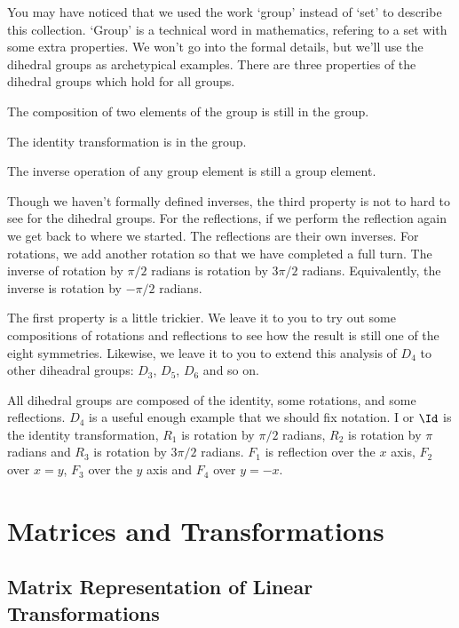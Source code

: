 \documentclass[fleqn]{report}
\begin{document}
You may have noticed that we used the work `group' instead of
`set' to describe this collection. `Group' is a technical
word in mathematics, refering to a set with some extra
properties. We won't go into the formal details, but we'll
use the dihedral groups as archetypical examples.
There are three properties of the dihedral groups which
hold for all groups.

\begin{smallitemize}
\item The composition of two elements of the group is still in
the group.
\item The identity transformation is in the group.
\item The inverse operation of any group element is still a
group element.
\end{smallitemize} 

Though we haven't formally defined inverses, the third
property is not to hard to see for the dihedral
groups. For the reflections, if we perform the reflection
again we get back to where we started. The reflections are
their own inverses. For rotations, we add another rotation
so that we have completed a full turn. The inverse of
rotation by $\pi/2$ radians is rotation by $3\pi/2$ radians.
Equivalently, the inverse is rotation by $-\pi/2$ radians.

The first property is a little trickier. We leave it to you to
try out some compositions of rotations and reflections to see
how the result is still one of the eight symmetries. Likewise,
we leave it to you to extend this analysis of $D_4$ to other
diheadral groups: $D_3$, $D_5$, $D_6$ and so on.

All dihedral groups are composed of the identity, some
rotations, and some reflections. $D_4$ is a useful enough
example that we should fix notation. I or $\Id$ is the
identity transformation, $R_1$ is rotation by $\pi/2$ radians,
$R_2$ is rotation by $\pi $radians and $R_3$ is rotation by
$3\pi/2$ radians. $F_1$ is reflection over the $x$ axis, $F_2$
over $x=y$, $F_3$ over the $y$ axis and $F_4$ over $y=-x$.

\section{Matrices and Transformations}
\label{matrices-and-transformations}

\subsection{Matrix Representation of Linear Transformations}
\label{matrix-representation}
\end{document}
